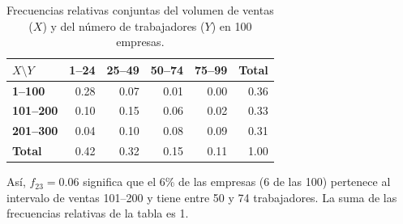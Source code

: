 \begin{table}[H]
\centering
\small
\renewcommand{\arraystretch}{1.15}
\begin{tabular}{|l|r|r|r|r|r|}
\hline
$X\setminus Y$ & \textbf{1--24} & \textbf{25--49} & \textbf{50--74} & \textbf{75--99} & \textbf{Total} \\ \hline
\textbf{1--100} & 0.28 & 0.07 & 0.01 & 0.00 & 0.36 \\ \hline
\textbf{101--200} & 0.10 & 0.15 & 0.06 & 0.02 & 0.33 \\ \hline
\textbf{201--300} & 0.04 & 0.10 & 0.08 & 0.09 & 0.31 \\ \hline
\textbf{Total} & 0.42 & 0.32 & 0.15 & 0.11 & 1.00 \\ \hline
\end{tabular}
\caption{Frecuencias relativas conjuntas del volumen de ventas ($X$) y del número de trabajadores ($Y$) en 100 empresas.}
\label{tab:ventas-trabajadores}
\end{table}

Así, $f_{23}=0.06$ significa que el 6\% de las empresas (6 de las 100) pertenece al intervalo de ventas 101--200 y tiene entre 50 y 74 trabajadores. La suma de las frecuencias relativas de la tabla es 1.
